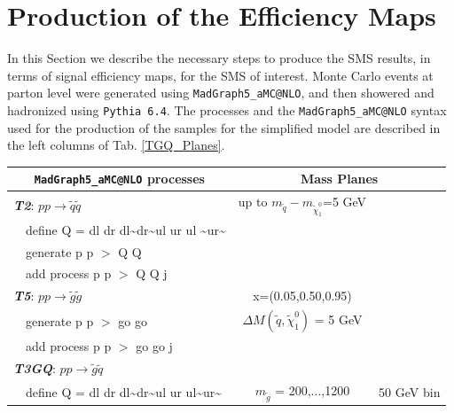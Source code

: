 \documentclass[a4paper,11pt]{article}
\newcommand{\TGQ}{ \textit{T3GQ}}
\newcommand{\Ttwo}{ \textit{T2}}
\newcommand{\Tfive}{ \textit{T5}}
\begin{document}
\section{Production of the Efficiency Maps}\label{EMprod}
In this Section we describe the necessary steps to produce the SMS results, in terms of signal efficiency maps, for the SMS of interest.
Monte Carlo events at parton level were generated using \texttt{MadGraph5\_aMC@NLO}\cite{Alwall:2011uj}, and then showered and hadronized using \texttt{Pythia 6.4}\cite{Sjostrand:2006za}. The processes and the \texttt{MadGraph5\_aMC@NLO} syntax used for the production of the samples for the simplified model are described in the left columns of Tab. \ref{TGQ_Planes}.
\begin{table}
			\small
	\begin{center}
		\renewcommand{\arraystretch}{1.0}

		\begin{tabular}{ l l | c c  }  \toprule  \toprule 
			\multicolumn{2}{c|}{\texttt{MadGraph5\_aMC@NLO} processes} &  \multicolumn{2}{c}{Mass Planes} \\ \toprule \toprule
			
			\multicolumn{2}{l|}{\textbf{\Ttwo}: $p p \rightarrow \tilde q \tilde q$} & up to $m_{\tilde q}-m_{\tilde \chi _1 ^0}$=5 GeV &  \\
			& define Q = dl dr dl\textasciitilde dr\textasciitilde ul ur ul \textasciitilde ur\textasciitilde & &  \\
			& generate p p $>$ Q Q & &  \\
			&  add process p p $>$ Q Q j & & \\  \toprule 
			
			
			\multicolumn{2}{l|}{\textbf{\Tfive}: $p p \rightarrow \tilde g \tilde g$ } & x=(0.05,0.50,0.95) & \\ 
			& generate p p $>$ go go & $\Delta M(\tilde q, \tilde \chi _1 ^0)$ = 5 GeV & \\
			&  add process p p $>$ go go j & &  \\ \toprule 
			
			
			\multicolumn{2}{l|}{\textbf{\TGQ}: $p p \rightarrow \tilde g \tilde q$} \\  
			&  define Q = dl dr dl\textasciitilde dr\textasciitilde ul ur ul\textasciitilde ur\textasciitilde & $m_{\tilde g}$ = 200,...,1200 & 50 GeV bin \\
			

\end{tabular}
\end{center}
\end{table}
\end{document}
